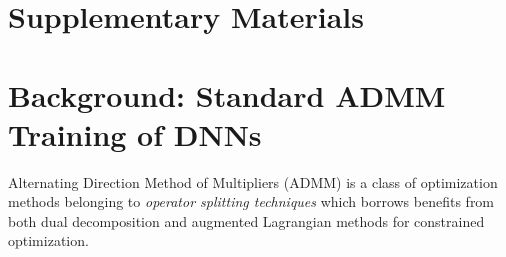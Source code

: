 \appendix 
\section*{Supplementary Materials}
\section{Background: Standard ADMM Training of DNNs} \label{sec:admm_nn}

Alternating Direction Method of Multipliers (ADMM) \cite{gabay1975dual,boyd2011distributed} is a class of optimization methods belonging to  \textit{operator splitting techniques} which borrows benefits from both dual decomposition and augmented Lagrangian methods for constrained optimization. %

